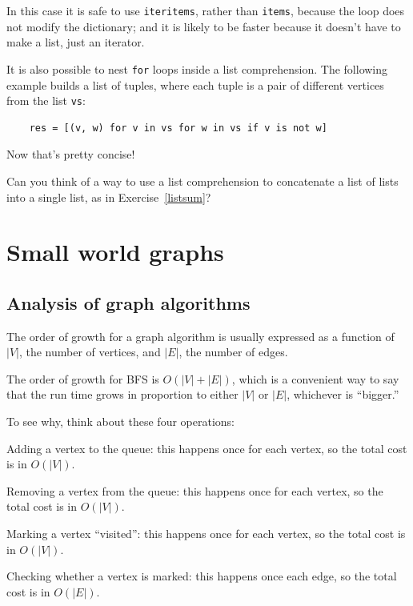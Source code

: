 \documentclass[10pt]{book}
\begin{document}
In this case it is safe to use
{\tt iteritems}, rather than {\tt items}, because
the loop does not modify the dictionary; and it is likely to be
faster because it doesn't have to make a list, just an iterator.

It is also possible to nest {\tt for} loops inside
a list comprehension.  The following example builds a list
of tuples, where each tuple is a pair of different vertices
from the list {\tt vs}:

\begin{verbatim}
    res = [(v, w) for v in vs for w in vs if v is not w]
\end{verbatim}

Now that's pretty concise!

\begin{ex}

Can you think of a way to use a list comprehension to concatenate
a list of lists into a single list, as in Exercise~\ref{listsum}?

\end{ex}


\chapter{Small world graphs}

\section{Analysis of graph algorithms}

The order of growth for a graph algorithm is usually expressed
as a function of $|V|$, the number of vertices, and $|E|$, the number
of edges.

The order of growth for BFS is $O(|V| + |E|)$, which is a convenient
way to say that the run time grows in proportion to either $|V|$ or
$|E|$, whichever is ``bigger.''

To see why, think about these four operations: 

\begin{description}

\item Adding a vertex to the queue: this happens once for each
vertex, so the total cost is in $O(|V|)$.

\item Removing a vertex from the queue: this happens once for each
vertex, so the total cost is in $O(|V|)$.

\item Marking a vertex ``visited'': this happens once for each
vertex, so the total cost is in $O(|V|)$.

\item Checking whether a vertex is marked: this happens once each
edge, so the total cost is in $O(|E|)$.

\end{description}
\end{document}
